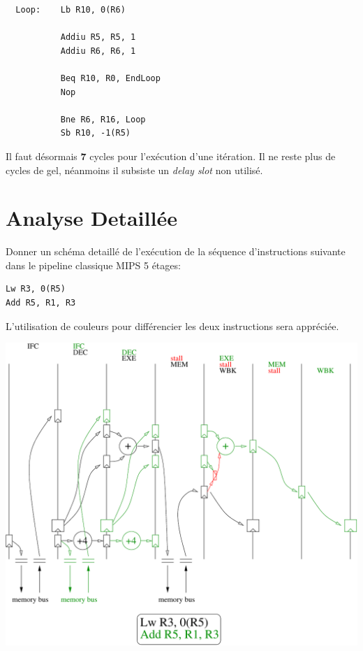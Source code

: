 \begin{correction}

  \begin{verbatim}
  Loop:    Lb R10, 0(R6)

           Addiu R5, R5, 1
           Addiu R6, R6, 1

           Beq R10, R0, EndLoop
           Nop

           Bne R6, R16, Loop
           Sb R10, -1(R5)
  \end{verbatim}

  Il faut d\'esormais \textbf{7} cycles pour l'ex\'ecution d'une it\'eration.
  Il ne reste plus de cycles de gel, n\'eanmoins il subsiste un
  \textit{delay slot} non utilis\'e.

\end{correction}

%
%

\section{Analyse Detaill\'ee}

Donner un sch\'ema detaill\'e de l'ex\'ecution de la s\'equence d'instructions
suivante dans le pipeline classique MIPS 5 \'etages:

\begin{verbatim}
Lw R3, 0(R5)
Add R5, R1, R3
\end{verbatim}

L'utilisation de couleurs pour diff\'erencier les deux instructions
sera appr\'eci\'ee.

\begin{correction}

  \begin{center}
    \includegraphics[scale=0.8]{figures/correction-analyse-detaillee.pdf}
  \end{center}

\end{correction}


